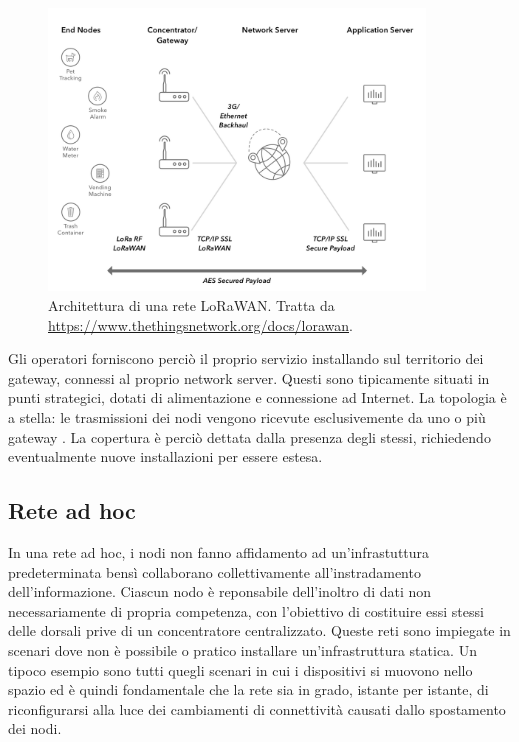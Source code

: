 \documentclass[a4paper,12pt]{article}
\theoremstyle{definition}
\begin{document}
\begin{figure}[H]
\centering
\includegraphics[width=10cm]{figures/lorawan.png}
\caption{Architettura di una rete LoRaWAN. Tratta da \protect\url{https://www.thethingsnetwork.org/docs/lorawan}.}
\end{figure}


Gli operatori forniscono perciò il proprio servizio installando sul territorio dei gateway, connessi al proprio network server. Questi sono tipicamente situati in punti strategici, dotati di alimentazione e connessione ad Internet. La topologia è a stella: le trasmissioni dei nodi vengono ricevute esclusivemente da uno o più gateway \cite{loraspec}. La copertura è perciò dettata dalla presenza degli stessi, richiedendo eventualmente nuove installazioni per essere estesa.

\subsection{Rete ad hoc}

In una rete ad hoc, i nodi non fanno affidamento ad un'infrastuttura predeterminata bensì collaborano collettivamente all'instradamento dell'informazione. Ciascun nodo è reponsabile dell'inoltro di dati non necessariamente di propria competenza, con l'obiettivo di costituire essi stessi delle dorsali prive di un concentratore centralizzato. Queste reti sono impiegate in scenari dove non è possibile o pratico installare un'infrastruttura statica. Un tipoco esempio sono tutti quegli scenari in cui i dispositivi si muovono nello spazio ed è quindi fondamentale che la rete sia in grado, istante per istante, di riconfigurarsi alla luce dei cambiamenti di connettività causati dallo spostamento dei nodi.
\end{document}
